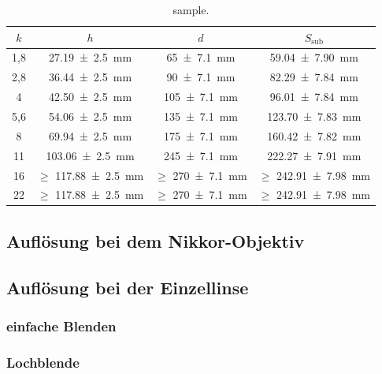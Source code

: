 		\begin{table}[ht]
			\centering
			\begin{tabular}{c|c|c|c}
				$k$ & $h$ & $d$ & $S_\text{sub}$\\
				\hline
				1,8 & \SI{27,19+-2,5}{\milli\meter} & \SI{65+-7,1}{\milli\meter} & \SI{59,04+-7,90}{\milli\meter}\\
				2,8 & \SI{36,44+-2,5}{\milli\meter} & \SI{90+-7,1}{\milli\meter} & \SI{82,29+-7,84}{\milli\meter}\\
				4 & \SI{42,50+-2,5}{\milli\meter} & \SI{105+-7,1}{\milli\meter} & \SI{96,01+-7,84}{\milli\meter}\\
				5,6 & \SI{54,06+-2,5}{\milli\meter} & \SI{135+-7,1}{\milli\meter} & \SI{123,70+-7,83}{\milli\meter}\\
				8 & \SI{69,94+-2,5}{\milli\meter} & \SI{175+-7,1}{\milli\meter} & \SI{160,42+-7,82}{\milli\meter} \\
				11 & \SI{103,06+-2,5}{\milli\meter} & \SI{245+-7,1}{\milli\meter} & \SI{222,27+-7,91}{\milli\meter}\\
				16 & $\geq$ \SI{117,88+-2,5}{\milli\meter} & $\geq$ \SI{270+-7,1}{\milli\meter} & $\geq$ \SI{242,91+-7,98}{\milli\meter}\\
				22 & $\geq$ \SI{117,88+-2,5}{\milli\meter} & $\geq$ \SI{270+-7,1}{\milli\meter} & $\geq$ \SI{242,91+-7,98}{\milli\meter}\\
			\end{tabular}
			\caption{sample.}
			\label{tab:Schärfentiefe_subj}
		\end{table}
			
		
	\subsection{Auflösung bei dem Nikkor-Objektiv}
		
		
	\subsection{Auflösung bei der Einzellinse}
	
		\subsubsection{einfache Blenden}
			
			
		\subsubsection{Lochblende}
		
